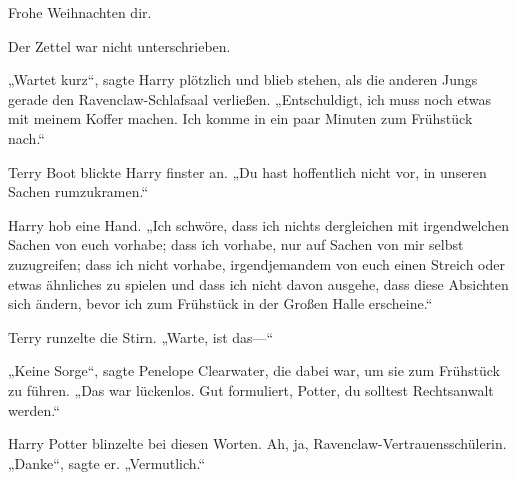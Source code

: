\begin{writtenNote}

Frohe Weihnachten dir.

\end{writtenNote}

Der Zettel war nicht unterschrieben.

\later

„Wartet kurz“, sagte Harry plötzlich und blieb stehen, als die anderen Jungs gerade den Ravenclaw-Schlafsaal verließen. „Entschuldigt, ich muss noch etwas mit meinem Koffer machen. Ich komme in ein paar Minuten zum Frühstück nach.“

Terry Boot blickte Harry finster an. „Du hast hoffentlich nicht vor, in unseren Sachen rumzukramen.“

Harry hob eine Hand. „Ich schwöre, dass ich nichts dergleichen mit irgendwelchen Sachen von euch vorhabe; dass ich vorhabe, nur auf Sachen von mir selbst zuzugreifen; dass ich nicht vorhabe, irgendjemandem von euch einen Streich oder etwas ähnliches zu spielen und dass ich nicht davon ausgehe, dass diese Absichten sich ändern, bevor ich zum Frühstück in der Großen Halle erscheine.“

Terry runzelte die Stirn. „Warte, ist das—“

„Keine Sorge“, sagte Penelope Clearwater, die dabei war, um sie zum Frühstück zu führen. „Das war lückenlos. Gut formuliert, Potter, du solltest Rechtsanwalt werden.“

Harry Potter blinzelte bei diesen Worten. Ah, ja, Ravenclaw-Vertrauensschülerin. „Danke“, sagte er. „Vermutlich.“

